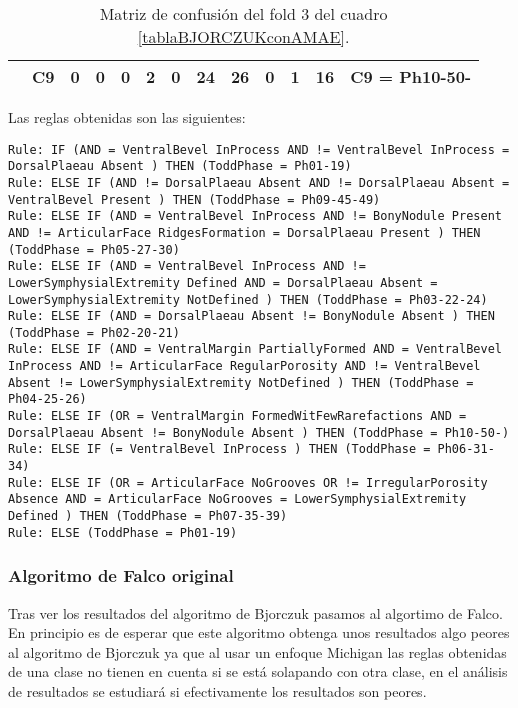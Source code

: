 \begin{table}[H]
{\begin{tabular}{|ccccccccccccc|}
\multicolumn{1}{|c|}{}                                      & \multicolumn{1}{c|}{C9} & \multicolumn{1}{c|}{0}  & \multicolumn{1}{c|}{0}  & \multicolumn{1}{c|}{0}  & \multicolumn{1}{c|}{\textbf{2}}  & \multicolumn{1}{c|}{0}  & \multicolumn{1}{c|}{\textbf{24}} & \multicolumn{1}{c|}{\textbf{26}} & \multicolumn{1}{c|}{0}  & \multicolumn{1}{c|}{\textbf{1}}  & \multicolumn{1}{c|}{\textbf{16}} & C9 = Ph10-50-     \\ \hline
\end{tabular}%
}
\caption{Matriz de confusión del fold 3 del cuadro \ref{tablaBJORCZUKconAMAE}.}
\end{table}


Las reglas obtenidas son las siguientes:

\begin{lstlisting}
Rule: IF (AND = VentralBevel InProcess AND != VentralBevel InProcess = DorsalPlaeau Absent ) THEN (ToddPhase = Ph01-19)
Rule: ELSE IF (AND != DorsalPlaeau Absent AND != DorsalPlaeau Absent = VentralBevel Present ) THEN (ToddPhase = Ph09-45-49)
Rule: ELSE IF (AND = VentralBevel InProcess AND != BonyNodule Present AND != ArticularFace RidgesFormation = DorsalPlaeau Present ) THEN (ToddPhase = Ph05-27-30)
Rule: ELSE IF (AND = VentralBevel InProcess AND != LowerSymphysialExtremity Defined AND = DorsalPlaeau Absent = LowerSymphysialExtremity NotDefined ) THEN (ToddPhase = Ph03-22-24)
Rule: ELSE IF (AND = DorsalPlaeau Absent != BonyNodule Absent ) THEN (ToddPhase = Ph02-20-21)
Rule: ELSE IF (AND = VentralMargin PartiallyFormed AND = VentralBevel InProcess AND != ArticularFace RegularPorosity AND != VentralBevel Absent != LowerSymphysialExtremity NotDefined ) THEN (ToddPhase = Ph04-25-26)
Rule: ELSE IF (OR = VentralMargin FormedWitFewRarefactions AND = DorsalPlaeau Absent != BonyNodule Absent ) THEN (ToddPhase = Ph10-50-)
Rule: ELSE IF (= VentralBevel InProcess ) THEN (ToddPhase = Ph06-31-34)
Rule: ELSE IF (OR = ArticularFace NoGrooves OR != IrregularPorosity Absence AND = ArticularFace NoGrooves = LowerSymphysialExtremity Defined ) THEN (ToddPhase = Ph07-35-39)
Rule: ELSE (ToddPhase = Ph01-19)
\end{lstlisting}


\newpage

\subsubsection{Algoritmo de Falco original}

Tras ver los resultados del algoritmo de Bjorczuk pasamos al algortimo de Falco. En principio es de esperar que este algoritmo obtenga unos resultados algo peores al algoritmo de Bjorczuk ya que al usar un enfoque Michigan las reglas obtenidas de una clase no tienen en cuenta si se está solapando con otra clase, en el análisis de resultados se estudiará si efectivamente los resultados son peores.


